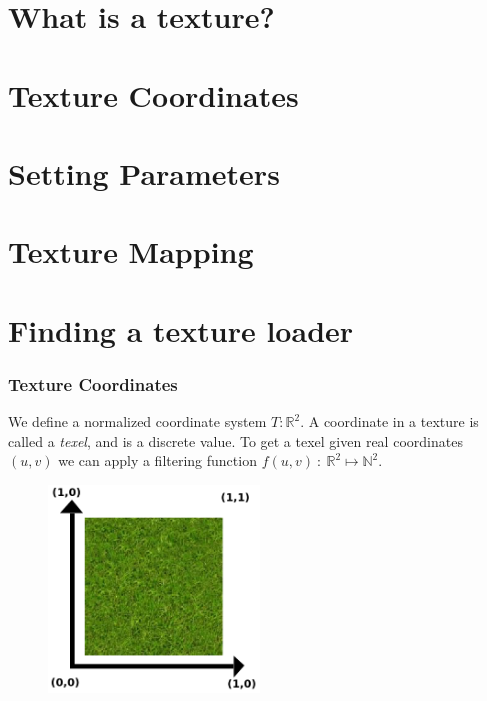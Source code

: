 \documentclass{beamer}
\begin{document}
%
%
%
\section{What is a texture?}

\section{Texture Coordinates}

\section{Setting Parameters}

\section{Texture Mapping}

\section{Finding a texture loader}


\begin{frame}
\frametitle{Texture Coordinates}
We define a normalized coordinate system $T : \mathbb{R}^2$.
A coordinate in a texture is called a \textit{texel}, and is a discrete value.
To get a texel given real coordinates $(u,v)$ we can apply a filtering
function $f(u,v)\ :\ \mathbb{R}^2 \mapsto \mathbb{N}^2$.
\begin{figure}
\includegraphics[width=0.5\textwidth]{images/textureCoordinates.png}
\end{figure}
\end{frame}
\end{document}
